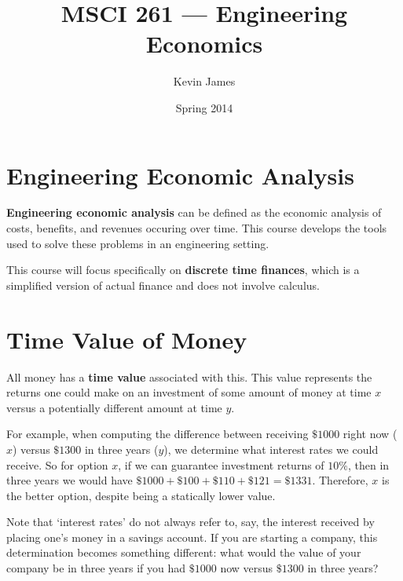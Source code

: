 \documentclass[12pt]{article}
\begin{document}
\title{MSCI 261 --- Engineering Economics}
\author{Kevin James}
\date{\vspace{-2ex}Spring 2014}
\maketitle\HRule

\section{Engineering Economic Analysis}
{\bf Engineering economic analysis} can be defined as the economic analysis of costs, benefits, and revenues occuring over time. This course develops the tools used to solve these problems in an engineering setting.

This course will focus specifically on {\bf discrete time finances}, which is a simplified version of actual finance and does not involve calculus.

\section{Time Value of Money}
All money has a {\bf time value} associated with this. This value represents the returns one could make on an investment of some amount of money at time $x$ versus a potentially different amount at time $y$.

For example, when computing the difference between receiving $\$1000$ right now ($x$) versus $\$1300$ in three years ($y$), we determine what interest rates we could receive. So for option $x$, if we can guarantee investment returns of $10\%$, then in three years we would have $\$1000 + \$100 + \$110 + \$121 = \$1331$. Therefore, $x$ is the better option, despite being a statically lower value.

Note that `interest rates' do not always refer to, say, the interest received by placing one's money in a savings account. If you are starting a company, this determination becomes something different: what would the value of your company be in three years if you had $\$1000$ now versus $\$1300$ in three years?
\end{document}
